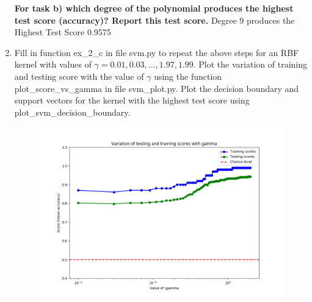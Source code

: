 \documentclass[a4paper]{article}
\begin{document}
\begin{enumerate}[label=(\alph*)]
\textbf{For task b) which degree of the polynomial produces the highest test score (accuracy)? Report this
test score.} \newline
Degree 9 produces the Highest Test Score 0.9575

\newpage

\item Fill in function ex\_2\_c in file svm.py to repeat the above steps for an RBF kernel with values of $\gamma = 0.01, 0.03, . . . , 1.97, 1.99$. Plot the variation of training and testing score with the value of $\gamma$ using the function plot\_score\_vs\_gamma in file svm\_plot.py. Plot the decision boundary and support vectors for the kernel with the highest test score using plot\_svm\_decision\_boundary.

\begin{figure}[htp]
\centering
\begin{minipage}{0.4\textwidth}
  \includegraphics[scale=0.38]{plots/ex2c_1.png}
  \label{fig:12}
\end{minipage}
\hfill
\begin{minipage}{0.4\textwidth}

\end{minipage}
\end{figure}
\end{enumerate}
\end{document}
